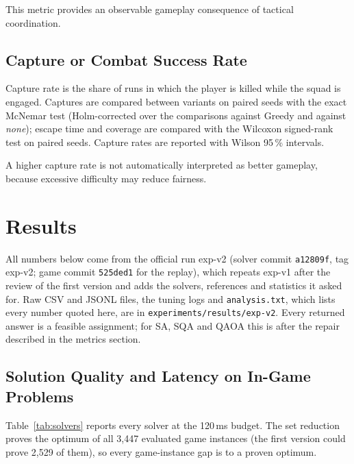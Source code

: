 \documentclass[12pt, a4paper]{article}
\begin{document}
This metric provides an observable gameplay consequence of tactical coordination.

\subsection*{Capture or Combat Success Rate}

Capture rate is the share of runs in which the player is killed while the squad is engaged. Captures are compared between variants on paired seeds with the exact McNemar test (Holm-corrected over the comparisons against Greedy and against \emph{none}); escape time and coverage are compared with the Wilcoxon signed-rank test on paired seeds. Capture rates are reported with Wilson 95\,\% intervals.

A higher capture rate is not automatically interpreted as better gameplay, because excessive difficulty may reduce fairness.

\section*{Results}

All numbers below come from the official run exp-v2 (solver commit \texttt{a12809f}, tag exp-v2; game commit \texttt{525ded1} for the replay), which repeats exp-v1 after the review of the first version and adds the solvers, references and statistics it asked for. Raw CSV and JSONL files, the tuning logs and \texttt{analysis.txt}, which lists every number quoted here, are in \texttt{experiments/results/exp-v2}. Every returned answer is a feasible assignment; for SA, SQA and QAOA this is after the repair described in the metrics section.

\subsection*{Solution Quality and Latency on In-Game Problems}

Table~\ref{tab:solvers} reports every solver at the 120\,ms budget. The set reduction proves the optimum of all 3{,}447 evaluated game instances (the first version could prove 2{,}529 of them), so every game-instance gap is to a proven optimum.

\begin{table}[htbp]
\centering
\resizebox{\linewidth}{!}{}
\caption{All solvers at the 120\,ms budget. Gap: mean optimality gap per instance (repeats averaged first). Opt.: share of runs at the proven optimum. p50: median latency. Evals: median number of candidate evaluations per run (moves for Greedy+LS, tabu search and SA-1h; samples otherwise). Raw feas.: share of the solver's own samples that were valid assignments before repair. Full: gap to the proven optimum or to an independent 2\,s reference. QAPLIB: gap to the published optimum (76 of the 77 instances; one has optimum 0).}
\label{tab:solvers}
\end{table}
\end{document}
